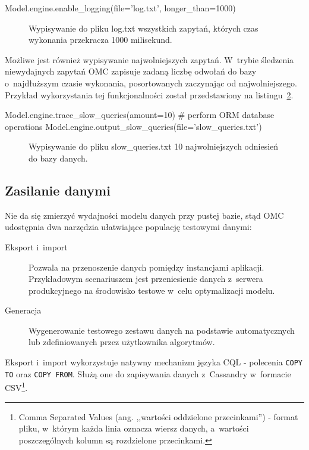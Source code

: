 \begin{verbbox}
	Model.engine.enable_logging(file='log.txt', longer_than=1000)
\end{verbbox}

\begin{figure}[ht!]
	\centering
	\theverbbox
	\caption{Wypisywanie do pliku log.txt wszystkich zapytań, których czas wykonania przekracza 1000 milisekund.}
	\label{vrb:engine_logging}
\end{figure}

Możliwe jest również wypisywanie najwolniejszych zapytań. W~trybie śledzenia niewydajnych zapytań OMC zapisuje zadaną liczbę odwołań do bazy o~najdłuższym czasie wykonania, posortowanych zaczynając od najwolniejszego. Przykład wykorzystania tej funkcjonalności został przedstawiony na listingu~\ref{vrb:engine_slow_queries}.

\begin{verbbox}
	Model.engine.trace_slow_queries(amount=10)
	# perform ORM database operations
	Model.engine.output_slow_queries(file='slow_queries.txt')
\end{verbbox}

\begin{figure}[ht!]
	\centering
	\theverbbox
	\caption{Wypisywanie do pliku slow\_queries.txt 10 najwolniejszych odniesień do bazy danych.}
	\label{vrb:engine_slow_queries}
\end{figure}

\subsection{Zasilanie danymi}

Nie da się zmierzyć wydajności modelu danych przy pustej bazie, stąd OMC udostępnia dwa narzędzia ułatwiające populację testowymi danymi:

\begin{description}
	\item[Eksport i~import] Pozwala na przenoszenie danych pomiędzy instancjami aplikacji. Przykładowym scenariuszem jest przeniesienie danych z~serwera produkcyjnego na środowisko testowe w~celu optymalizacji modelu.
	\item[Generacja] Wygenerowanie testowego zestawu danych na podstawie automatycznych lub zdefiniowanych przez użytkownika algorytmów.
\end{description}

Eksport i~import wykorzystuje natywny mechanizm języka CQL - polecenia \verb+COPY TO+ oraz \verb+COPY FROM+. Służą one do zapisywania danych z~Cassandry w~formacie CSV\footnote{Comma Separated Values (ang. ,,wartości oddzielone przecinkami'') - format pliku, w~którym każda linia oznacza wiersz danych, a~wartości poszczególnych kolumn są rozdzielone przecinkami.}. 

